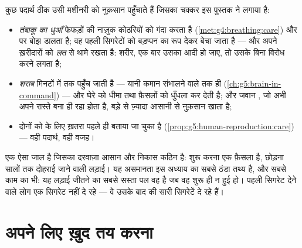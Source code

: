 \begin{proposition}[शरीर को धोखा देने वाले पदार्थ]\label{prop:g5:healthy-choices:substances}
कुछ पदार्थ ठीक उसी मशीनरी को नुक़सान पहुँचाते हैं जिसका चक्कर इस पुस्तक
ने लगाया है:
\begin{itemize}
  \item \emph{तंबाकू का धुआँ} फेफड़ों की नाज़ुक कोठरियों को गंदा करता
        है (\cref{met:g4:breathing:care}) और  पर बोझ डालता है; वह
        पहली सिगरेटों को बड़प्पन का रूप देकर बेचा जाता है --- और अपने
        ख़रीदारों को \emph{लत} से थामे रखता है: शरीर, एक बार
        उसका आदी हो जाए, तो उसके बिना विरोध करने लगता है;
  \item \emph{शराब} मिनटों में  तक पहुँच जाती है --- यानी
        कमान संभालने वाले तक ही
        (\cref{ch:g5:brain-in-command}) --- और घेरे को धीमा तथा फ़ैसलों
        को धुँधला कर देती है; और जवान , जो अभी अपने रास्ते बना
        ही रहा होता है, बड़े  से ज़्यादा आसानी से नुक़सान खाता
        है;
  \item दोनों को  के लिए ख़तरा पहले ही बताया जा चुका है
        (\cref{prop:g5:human-reproduction:care}) --- वही पदार्थ, वही
        वजह।
\end{itemize}
\end{proposition}
\admitted

\begin{remark}\label{rem:g5:healthy-choices:never}
 एक ऐसा जाल है जिसका दरवाज़ा आसान और निकास कठिन है: शुरू करना एक
फ़ैसला है, छोड़ना सालों तक दोहराई जाने वाली लड़ाई। यह असमानता इस अध्याय
का सबसे ठंडा तथ्य है, और सबसे काम का भी: यह लड़ाई जीतने का सबसे सस्ता
पल वह है जब वह शुरू ही न हुई हो। पहली सिगरेट देने वाले लोग एक सिगरेट
नहीं दे रहे --- वे उसके बाद की सारी सिगरेटें दे रहे हैं।
\end{remark}

\section{अपने लिए ख़ुद तय करना}

